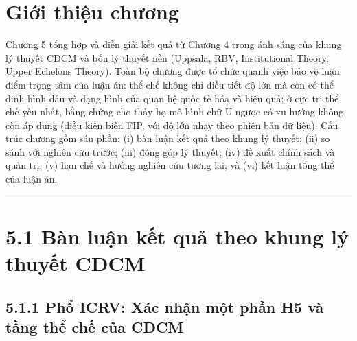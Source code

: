 \documentclass[
  a4paper,
  13pt]{extreport}
\begin{document}
\hypertarget{giux1edbi-thiux1ec7u-chux1b0ux1a1ng-1}{%
\section{Giới thiệu
chương}\label{giux1edbi-thiux1ec7u-chux1b0ux1a1ng-1}}

Chương 5 tổng hợp và diễn giải kết quả từ Chương 4 trong ánh sáng của
khung lý thuyết CDCM và bốn lý thuyết nền (Uppsala, RBV, Institutional
Theory, Upper Echelons Theory). Toàn bộ chương được tổ chức quanh việc
bảo vệ luận điểm trọng tâm của luận án: thể chế không chỉ điều tiết độ
lớn mà còn có thể định hình dấu và dạng hình của quan hệ quốc tế hóa và
hiệu quả; ở cực trị thể chế yếu nhất, bằng chứng cho thấy họ mô hình chữ
U ngược có xu hướng không còn áp dụng (điều kiện biên FIP, với độ lớn
nhạy theo phiên bản dữ liệu). Cấu trúc chương gồm sáu phần: (i) bàn luận
kết quả theo khung lý thuyết; (ii) so sánh với nghiên cứu trước; (iii)
đóng góp lý thuyết; (iv) đề xuất chính sách và quản trị; (v) hạn chế và
hướng nghiên cứu tương lai; và (vi) kết luận tổng thể của luận án.

\begin{center}\rule{0.5\linewidth}{0.5pt}\end{center}

\hypertarget{buxe0n-luux1eadn-kux1ebft-quux1ea3-theo-khung-luxfd-thuyux1ebft-cdcm}{%
\section{5.1 Bàn luận kết quả theo khung lý thuyết
CDCM}\label{buxe0n-luux1eadn-kux1ebft-quux1ea3-theo-khung-luxfd-thuyux1ebft-cdcm}}

\hypertarget{phux1ed5-icrv-xuxe1c-nhux1eadn-mux1ed9t-phux1ea7n-h5-vuxe0-tux1ea7ng-thux1ec3-chux1ebf-cux1ee7a-cdcm}{%
\subsection{5.1.1 Phổ ICRV: Xác nhận một phần H5 và tầng thể chế của
CDCM}\label{phux1ed5-icrv-xuxe1c-nhux1eadn-mux1ed9t-phux1ea7n-h5-vuxe0-tux1ea7ng-thux1ec3-chux1ebf-cux1ee7a-cdcm}}
\end{document}
